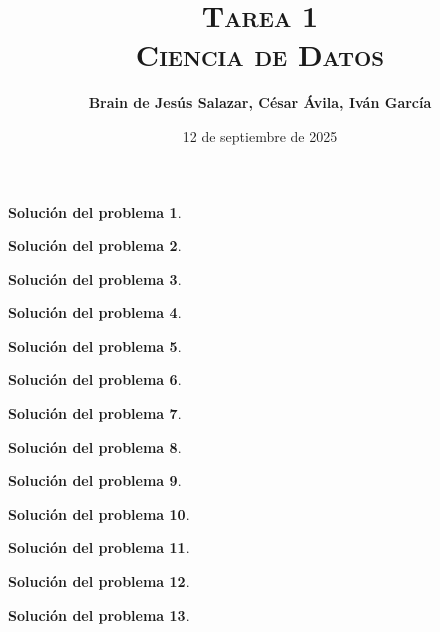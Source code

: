 \documentclass[twoside,12pt]{article}
\title{\textsc{Tarea 1\\ {\Large Ciencia de Datos}}}
\author{\large{\textbf{Brain de Jesús Salazar, César Ávila, Iván García}}}
\date{12 de septiembre de 2025}
\theoremstyle{definition}
\newtheorem{soln}{Solución del problema}
\begin{document}
\maketitle

\begin{soln}

\end{soln}

\newpage
\begin{soln}

\end{soln}

\newpage
\begin{soln}

\end{soln}

\newpage
\begin{soln}

\end{soln}

\newpage
\begin{soln}

\end{soln}

\newpage
\begin{soln}

\end{soln}

\newpage
\begin{soln}

\end{soln}

\newpage
\begin{soln}

\end{soln}

\newpage
\begin{soln}

\end{soln}

\newpage
\begin{soln}

\end{soln}

\newpage
\begin{soln}

\end{soln}

\newpage
\begin{soln}

\end{soln}

\newpage
\begin{soln}

\end{soln}
\end{document}
